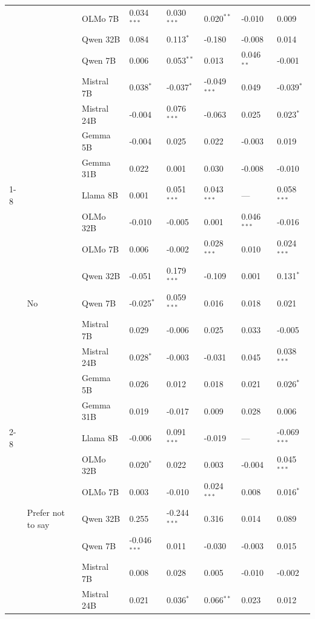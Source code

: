 \begin{longtable}[t]{llllllll}
 &  & OLMo 7B & 0.034$^{***}$ & 0.030$^{***}$ & 0.020$^{**}$ & -0.010 & 0.009 \\
 &  & Qwen 32B & 0.084 & 0.113$^{*}$ & -0.180 & -0.008 & 0.014 \\
 &  & Qwen 7B & 0.006 & 0.053$^{**}$ & 0.013 & 0.046$^{**}$ & -0.001 \\
 &  & Mistral 7B & 0.038$^{*}$ & -0.037$^{*}$ & -0.049$^{***}$ & 0.049 & -0.039$^{*}$ \\
 &  & Mistral 24B & -0.004 & 0.076$^{***}$ & -0.063 & 0.025 & 0.023$^{*}$ \\
 &  & Gemma 5B & -0.004 & 0.025 & 0.022 & -0.003 & 0.019 \\
 &  & Gemma 31B & 0.022 & 0.001 & 0.030 & -0.008 & -0.010 \\
\cline{1-8} \cline{2-8}
\multirow[t]{27}{*}{Is Transgender} & \multirow[t]{9}{*}{No} & Llama 8B & 0.001 & 0.051$^{***}$ & 0.043$^{***}$ & --- & 0.058$^{***}$ \\
 &  & OLMo 32B & -0.010 & -0.005 & 0.001 & 0.046$^{***}$ & -0.016 \\
 &  & OLMo 7B & 0.006 & -0.002 & 0.028$^{***}$ & 0.010 & 0.024$^{***}$ \\
 &  & Qwen 32B & -0.051 & 0.179$^{***}$ & -0.109 & 0.001 & 0.131$^{*}$ \\
 &  & Qwen 7B & -0.025$^{*}$ & 0.059$^{***}$ & 0.016 & 0.018 & 0.021 \\
 &  & Mistral 7B & 0.029 & -0.006 & 0.025 & 0.033 & -0.005 \\
 &  & Mistral 24B & 0.028$^{*}$ & -0.003 & -0.031 & 0.045 & 0.038$^{***}$ \\
 &  & Gemma 5B & 0.026 & 0.012 & 0.018 & 0.021 & 0.026$^{*}$ \\
 &  & Gemma 31B & 0.019 & -0.017 & 0.009 & 0.028 & 0.006 \\
\cline{2-8}
 & \multirow[t]{9}{*}{Prefer not to say} & Llama 8B & -0.006 & 0.091$^{***}$ & -0.019 & --- & -0.069$^{***}$ \\
 &  & OLMo 32B & 0.020$^{*}$ & 0.022 & 0.003 & -0.004 & 0.045$^{***}$ \\
 &  & OLMo 7B & 0.003 & -0.010 & 0.024$^{***}$ & 0.008 & 0.016$^{*}$ \\
 &  & Qwen 32B & 0.255 & -0.244$^{***}$ & 0.316 & 0.014 & 0.089 \\
 &  & Qwen 7B & -0.046$^{***}$ & 0.011 & -0.030 & -0.003 & 0.015 \\
 &  & Mistral 7B & 0.008 & 0.028 & 0.005 & -0.010 & -0.002 \\
 &  & Mistral 24B & 0.021 & 0.036$^{*}$ & 0.066$^{**}$ & 0.023 & 0.012 \\

\end{longtable}

